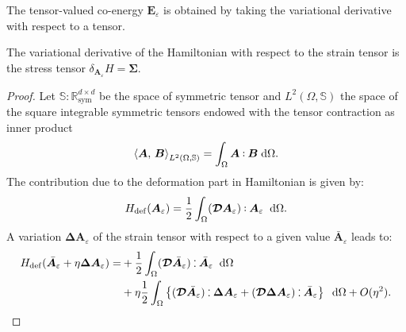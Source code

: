 The tensor-valued co-energy $\bm{E}_\varepsilon$ is obtained by taking the variational derivative with respect to a tensor.
\begin{proposition}\label{prop:varder_tens}
	The variational derivative of the Hamiltonian with respect to the strain tensor is the stress tensor $\delta_{\bm{A}_{\varepsilon}}H = \bm{\Sigma}$.
	\begin{proof}
		Let $\mathbb{S}: \mathbb{R}^{d\times d}_{\text{sym}}$ be the space of symmetric tensor and  $L^2(\Omega, \mathbb{S})$ the space of the square integrable symmetric tensors endowed with the tensor contraction as inner product
		\begin{equation}\label{eq:normL2sym}
		\inner[L^2(\Omega, \mathbb{S})]{\bm{A}}{\bm{B}} = \int_{\Omega} \bm{A} \cddot \bm{B} \d\Omega. 
		\end{equation}
		The contribution due to the deformation part in Hamiltonian is given by:		\begin{equation*}
		H_{\mathrm{def}}(\bm{A}_{\varepsilon}) = \frac{1}{2} \int_{\Omega} (\bm{\mathcal{D}} \bm{A}_{\varepsilon}) \cddot \bm{A}_{\varepsilon}  \; \d\Omega. 
		\end{equation*}
		A variation $\bm{\Delta}\bm{A}_{\varepsilon}$ of the strain tensor with respect to a given value $\bar{\bm{A}}_{\varepsilon}$ leads to:
		\begin{align*}
		H_{\mathrm{def}}(\bar{\bm{A}}_{\varepsilon} + \eta \bm{\Delta}\bm{A}_{\varepsilon}) = &+\frac{1}{2} \int_{\Omega} (\bm{\mathcal{D}} \bar{\bm{A}}_{\varepsilon}) \cddot \bar{\bm{A}}_{\varepsilon} \; \d\Omega \\
		&+ \eta \frac{1}{2} \int_{\Omega} \left\{ (\bm{\mathcal{D}} \bar{\bm{A}}_{\varepsilon}) \cddot \bm{\Delta}\bm{A}_{\varepsilon}
		+ (\bm{\mathcal{D}} \bm{\Delta}\bm{A}_{\varepsilon}) \cddot \bar{\bm{A}}_{\varepsilon}\right\}\; \d\Omega  + O(\eta^2).
		\end{align*}


\end{proof}
\end{proposition}
